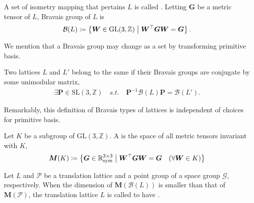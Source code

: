 \begin{screen}
  \begin{defn}
    A set of isometry mapping that pertains $L$ is called .
    Letting $\bm{G}$ be a metric tensor of $L$, Bravais group of $L$ is
    \begin{align}
      \mathcal{B}(L) \coloneqq \left\{  \bm{W} \in \mathrm{GL}(3, \mathbb{Z})  \mathrel{}\middle|\mathrel{}  \bm{W}^{\top}\bm{GW} = \bm{G}  \right\}.
    \end{align}
  \end{defn}
\end{screen}

We mention that a Bravais group may change as a set by transforming primitive basis.

\begin{screen}
  \begin{defn}
    Two lattices $L$ and $L'$ belong to the same  if their Bravais groups are conjugate by some unimodular matrix,
    \begin{align}
      \exists \bm{P} \in \mathrm{SL}(3, \mathbb{Z}) \quad s.t. \quad \bm{P}^{-1} \mathcal{B}(L) \bm{P} = \mathcal{B}(L').
    \end{align}
  \end{defn}
\end{screen}
Remarkably, this definition of Bravais types of lattices is independent of choices for primitive basis.

\begin{screen}
  \begin{defn}
    Let $K$ be a subgroup of $\mathrm{GL}(3, \mathbb{Z})$.
    A  is the space of all metric tensors invariant with $K$,
    \begin{align}
      \bm{M}( K ) \coloneqq \left\{  \bm{G} \in \mathbb{R}^{3 \times 3}_{\mathrm{sym}}  \mathrel{}\middle|\mathrel{}  \bm{W}^{\top}\bm{G}\bm{W} = \bm{G} \quad (\forall \bm{W} \in K )  \right\}
    \end{align}
  \end{defn}
\end{screen}

Let $L$ and $\mathcal{P}$ be a translation lattice and a point group of a space group $\mathcal{G}$, respectively.
When the dimension of $\bm{M}(\mathcal{B}(L))$ is smaller than that of $\bm{M}(\mathcal{P})$, the translation lattice $L$ is called to have .


